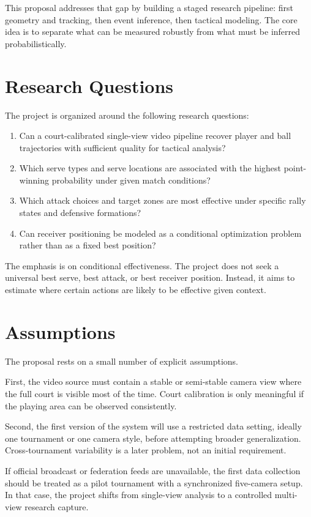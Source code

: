 \documentclass[a4paper]{article}
\begin{document}
This proposal addresses that gap by building a staged research pipeline: first geometry and tracking, then event inference, then tactical modeling. The core idea is to separate what can be measured robustly from what must be inferred probabilistically.

\section{Research Questions}
The project is organized around the following research questions:
\begin{enumerate}
	\item Can a court-calibrated single-view video pipeline recover player and ball trajectories with sufficient quality for tactical analysis?
	\item Which serve types and serve locations are associated with the highest point-winning probability under given match conditions?
	\item Which attack choices and target zones are most effective under specific rally states and defensive formations?
	\item Can receiver positioning be modeled as a conditional optimization problem rather than as a fixed best position?
\end{enumerate}

The emphasis is on conditional effectiveness. The project does not seek a universal best serve, best attack, or best receiver position. Instead, it aims to estimate where certain actions are likely to be effective given context.

\section{Assumptions}
The proposal rests on a small number of explicit assumptions.

First, the video source must contain a stable or semi-stable camera view where the full court is visible most of the time. Court calibration is only meaningful if the playing area can be observed consistently.

Second, the first version of the system will use a restricted data setting, ideally one tournament or one camera style, before attempting broader generalization. Cross-tournament variability is a later problem, not an initial requirement.

If official broadcast or federation feeds are unavailable, the first data collection should be treated as a pilot tournament with a synchronized five-camera setup. In that case, the project shifts from single-view analysis to a controlled multi-view research capture.
\end{document}
